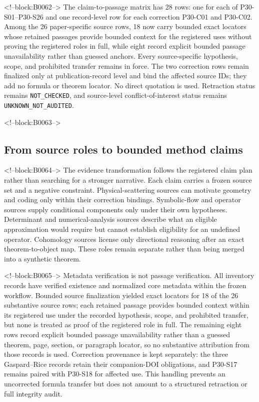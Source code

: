 \documentclass[11pt,a4paper]{article}
\begin{document}
<!--block:B0062-->
The claim-to-passage matrix has 28 rows: one for each of P30-S01--P30-S26 and
one record-level row for each correction P30-C01 and P30-C02.  Among the 26
paper-specific source rows, 18 now carry bounded exact locators whose retained
passages provide bounded context for the registered uses without proving the
registered roles in full, while eight record explicit bounded passage unavailability
rather than guessed anchors.  Every source-specific hypothesis, scope, and
prohibited transfer remains in force.  The two correction rows remain finalized
only at publication-record level and bind the affected source IDs; they add no
formula or theorem locator.  No direct quotation is used.  Retraction status
remains \texttt{NOT\_\allowbreak CHECKED}, and source-level conflict-of-interest
status remains \texttt{UNKNOWN\_\allowbreak NOT\_\allowbreak AUDITED}.

<!--block:B0063-->
\subsection{From source roles to bounded method claims}

<!--block:B0064-->
The evidence transformation follows the registered claim plan rather than
searching for a stronger narrative.  Each claim carries a frozen source set
and a negative constraint.  Physical-scattering sources can motivate geometry
and coding only within their correction bindings.  Symbolic-flow and operator
sources supply conditional components only under their own hypotheses.
Determinant and numerical-analysis sources describe what an eligible
approximation would require but cannot establish eligibility for an undefined
operator.  Cohomology sources license only directional reasoning after an exact
theorem-to-object map.  These roles remain separate rather than being merged
into a synthetic theorem.

<!--block:B0065-->
Metadata verification is not passage verification. All inventory records have verified existence and normalized core metadata within the frozen workflow. Bounded source finalization yielded exact locators for 18 of the 26 substantive source rows; each retained passage provides bounded context within its registered use under the recorded hypothesis, scope, and prohibited transfer, but none is treated as proof of the registered role in full. The remaining eight rows record explicit bounded passage unavailability rather than a guessed theorem, page, section, or paragraph locator, so no substantive attribution from those records is used. Correction provenance is kept separately: the three Gaspard--Rice records retain their companion-DOI obligations, and P30-S17 remains paired with P30-S18 for affected use. This handling prevents an uncorrected formula transfer but does not amount to a structured retraction or full integrity audit.
\end{document}
